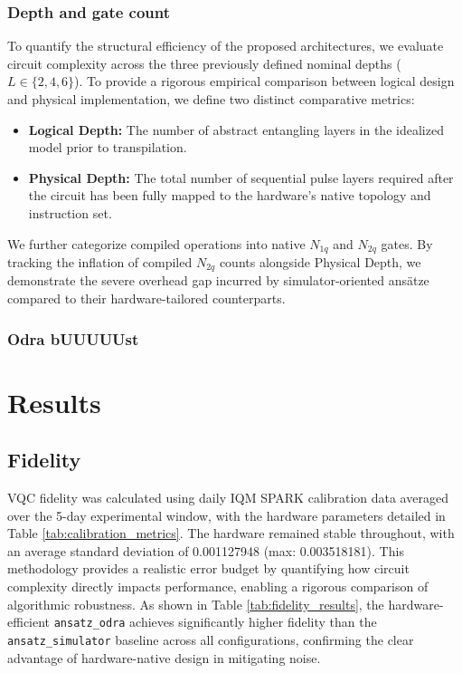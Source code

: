 \documentclass[11pt]{article}
\begin{document}
\subsubsection{Depth and gate count}

To quantify the structural efficiency of the proposed architectures, we evaluate circuit complexity across the three previously defined nominal depths ($L \in \{2, 4, 6\}$). To provide a rigorous empirical comparison between logical design and physical implementation, we define two distinct comparative metrics:
\begin{itemize}
    \item \textbf{Logical Depth:} The number of abstract entangling layers in the idealized model prior to transpilation.
    \item \textbf{Physical Depth:} The total number of sequential pulse layers required after the circuit has been fully mapped to the hardware's native topology and instruction set.
\end{itemize}
We further categorize compiled operations into native $N_{1q}$ and $N_{2q}$ gates. By tracking the inflation of compiled $N_{2q}$ counts alongside Physical Depth, we demonstrate the severe overhead gap incurred by simulator-oriented ansätze compared to their hardware-tailored counterparts.

\subsubsection{Odra bUUUUUst}



\section{Results}

\subsection{Fidelity}
VQC fidelity was calculated using daily IQM SPARK calibration data averaged over the 5-day experimental window, with the hardware parameters detailed in Table \ref{tab:calibration_metrics}. The hardware remained stable throughout, with an average standard deviation of 0.001127948 (max: 0.003518181). This methodology provides a realistic error budget by quantifying how circuit complexity directly impacts performance, enabling a rigorous comparison of algorithmic robustness. As shown in Table \ref{tab:fidelity_results}, the hardware-efficient \texttt{ansatz\_odra} achieves significantly higher fidelity than the \texttt{ansatz\_simulator} baseline across all configurations, confirming the clear advantage of hardware-native design in mitigating noise.
\end{document}
